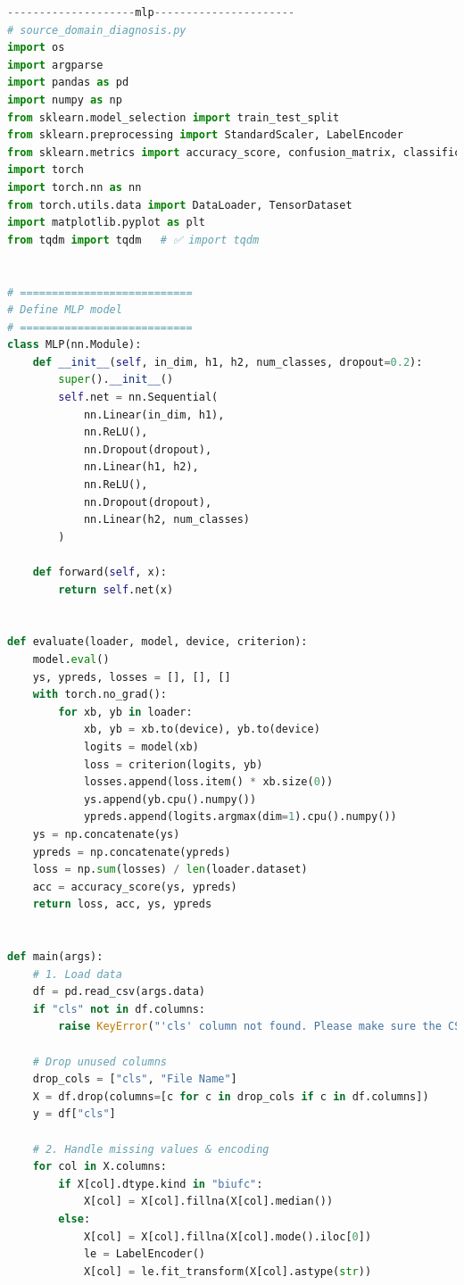 \documentclass[a4paper]{CPIPC}
\numberwithin{equation}{section}
\begin{document}
\begin{lstlisting}[language=Python, caption=MLP Classifier]
--------------------mlp----------------------
# source_domain_diagnosis.py
import os
import argparse
import pandas as pd
import numpy as np
from sklearn.model_selection import train_test_split
from sklearn.preprocessing import StandardScaler, LabelEncoder
from sklearn.metrics import accuracy_score, confusion_matrix, classification_report
import torch
import torch.nn as nn
from torch.utils.data import DataLoader, TensorDataset
import matplotlib.pyplot as plt
from tqdm import tqdm   # ✅ import tqdm


# ===========================
# Define MLP model
# ===========================
class MLP(nn.Module):
    def __init__(self, in_dim, h1, h2, num_classes, dropout=0.2):
        super().__init__()
        self.net = nn.Sequential(
            nn.Linear(in_dim, h1),
            nn.ReLU(),
            nn.Dropout(dropout),
            nn.Linear(h1, h2),
            nn.ReLU(),
            nn.Dropout(dropout),
            nn.Linear(h2, num_classes)
        )

    def forward(self, x):
        return self.net(x)


def evaluate(loader, model, device, criterion):
    model.eval()
    ys, ypreds, losses = [], [], []
    with torch.no_grad():
        for xb, yb in loader:
            xb, yb = xb.to(device), yb.to(device)
            logits = model(xb)
            loss = criterion(logits, yb)
            losses.append(loss.item() * xb.size(0))
            ys.append(yb.cpu().numpy())
            ypreds.append(logits.argmax(dim=1).cpu().numpy())
    ys = np.concatenate(ys)
    ypreds = np.concatenate(ypreds)
    loss = np.sum(losses) / len(loader.dataset)
    acc = accuracy_score(ys, ypreds)
    return loss, acc, ys, ypreds


def main(args):
    # 1. Load data
    df = pd.read_csv(args.data)
    if "cls" not in df.columns:
        raise KeyError("'cls' column not found. Please make sure the CSV file contains a class label column named 'cls'")

    # Drop unused columns
    drop_cols = ["cls", "File Name"]
    X = df.drop(columns=[c for c in drop_cols if c in df.columns])
    y = df["cls"]

    # 2. Handle missing values & encoding
    for col in X.columns:
        if X[col].dtype.kind in "biufc":
            X[col] = X[col].fillna(X[col].median())
        else:
            X[col] = X[col].fillna(X[col].mode().iloc[0])
            le = LabelEncoder()
            X[col] = le.fit_transform(X[col].astype(str))


\end{lstlisting}
\end{document}
